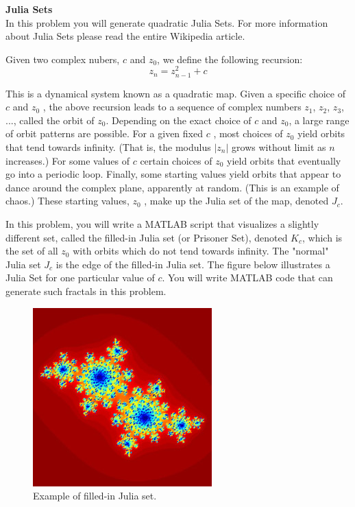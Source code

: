\documentclass[12pt]{TDTP}
\begin{document}
\Exo
\textbf{Julia Sets}\\
In this problem you will generate quadratic Julia Sets. 
For more information about Julia Sets please read the entire  Wikipedia article.

Given two complex nubers, $c$ and $z_0$, we define the following recursion:
$$
z_n = z_{n-1}^2 +c
$$

This is a dynamical system known as a quadratic map. Given a specific choice of $c$ and $z_0$ , the above recursion leads to a sequence of complex numbers $z_1$, $z_2$, $z_3$, ..., called the orbit of $z_0$.
Depending on the exact choice of $c$ and $z_0$, a large range of orbit patterns are possible. 
For a given fixed $c$ , most choices of $z_0$ yield orbits that tend towards infinity. (That is, the modulus $|z_n|$ grows without limit as $n$ increases.)
For some values of $c$ certain choices of $z_0$ yield orbits that eventually go into a periodic loop. Finally, some starting values yield orbits that appear to dance around the complex plane, apparently at random. (This is an example of chaos.) 
These starting values, $z_0$ , make up the Julia set of the map, denoted $J_c$. 

In this problem, you will write a MATLAB script that visualizes a slightly different set, called the filled-in Julia set (or Prisoner Set), denoted $K_c$, which is the set of all $z_0$ with orbits which do not tend towards infinity.
The "normal" Julia set $J_c$ is the edge of the filled-in Julia set. The figure below illustrates a Julia Set for one particular value of $c$.
You will write MATLAB code that can generate such fractals in this problem.

\begin{figure}[h!]
\begin{center}
\includegraphics[scale=0.5]{images/julia.jpg}
\caption{Example of filled-in Julia set.}
\end{center}
\end{figure}
\end{document}
